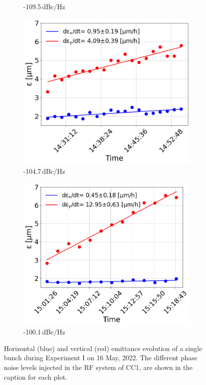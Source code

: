 \begin{figure}[htp]
\begin{subfigure}{.45\textwidth}
       \caption{-109.5\,dBc/Hz}
       \label{fig:cc_md_2022_coast3}
   \end{subfigure}
   \begin{subfigure}{.45\textwidth}
       \centering
       \includegraphics[width=.95\linewidth]{images/Ch8/emit_vs_time_Set1_coast4.png}  
       \caption{-104.7\,dBc/Hz}
       \label{fig:cc_md_2022_coast4}
   \end{subfigure}
   \begin{subfigure}{.45\textwidth}
           \centering
           \includegraphics[width=.95\linewidth]{images/Ch8/emit_vs_time_Set1_coast5.png}  
           \caption{-100.1\,dBc/Hz}
           \label{fig:cc_md_2022_coast5}
   \end{subfigure}
   \caption{Horizontal (blue) and vertical (red) emittance evolution of a single bunch during Experiment I on 16 May, 2022. The different phase noise levels injected in the RF system of CC1, are shown in the caption for each plot.}
   \label{fig:cc_md_2022_overview_plots_noise_scan}
\end{figure}

